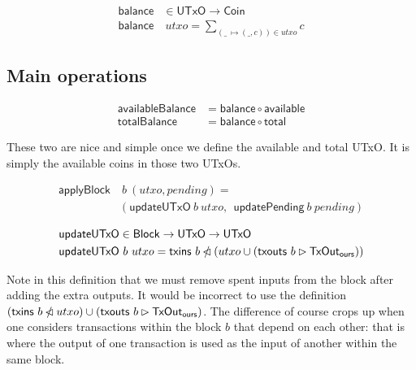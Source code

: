 \documentclass{article}
\newcommand{\restrictdom}{\lhd}
\newcommand{\subtractdom}{\mathbin{\slashed{\restrictdom}}}
\newcommand{\restrictrange}{\rhd}
\begin{document}
\begin{equation}
\begin{split}
\mathsf{balance}& \in \mathsf{UTxO} \to \mathsf{Coin} \\
\mathsf{balance}& ~ utxo = \sum_{(\_ ~ \mapsto (\_, c)) \in utxo} c
\end{split}
\end{equation}

\subsection{Main operations}
\label{sec:main_operations}

\begin{equation}
\begin{split}
\mathsf{availableBalance} & = \mathsf{balance} \circ \mathsf{available} \\
\mathsf{totalBalance}     & = \mathsf{balance} \circ \mathsf{total}
\end{split}
\end{equation}

These two are nice and simple once we define the available and total UTxO. It
is simply the available coins in those two UTxOs.

\begin{equation} \label{applyBlock_spec}
\begin{split}
\mathsf{applyBlock} & ~ b ~ (utxo, pending) = \\
                    & (\mathsf{updateUTxO} ~ b ~ utxo, ~~ \mathsf{updatePending} ~ b ~ pending)
\end{split}
\end{equation}

\begin{equation}
\begin{split}
\mathsf{updateUTxO} & \in \mathsf{Block} \to \mathsf{UTxO} \to \mathsf{UTxO} \\
\mathsf{updateUTxO} & ~ b ~ utxo = \mathsf{txins} ~ b \subtractdom (utxo \cup (\mathsf{txouts} ~ b \restrictrange \mathsf{TxOut_{ours}}))
\end{split}
\end{equation}

Note in this definition that we must remove spent inputs from the block after
adding the extra outputs. It would be incorrect to use the definition $(\mathsf{txins} ~ b \subtractdom utxo)  \cup (\mathsf{txouts} ~ b \restrictrange \mathsf{TxOut_{ours}})$.
The difference of course crops up when one considers transactions within the
block $b$ that depend on each other: that is where the output of one transaction
is used as the input of another within the same block.
\end{document}
